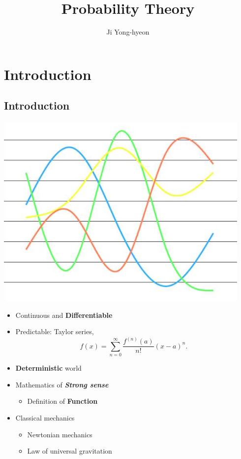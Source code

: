 \documentclass[12pt,a4paper]{article}
\author{Ji Yong-hyeon}
\title{\bf\Huge Probability Theory}
\theoremstyle{definition}
\theoremstyle{definition}
\theoremstyle{definition}
\theoremstyle{definition}
\theoremstyle{remark}
\theoremstyle{definition}
\begin{document}
\maketitle
\tableofcontents

\newpage
\section{Introduction}

\subsection{Introduction}
\begin{minipage}{0.49\textwidth}
	\begin{center}
	\includegraphics[width=.8\linewidth,height=.13\textheight]{differentiable.png}
	\end{center}
	\begin{itemize}
		\item Continuous and \textbf{Differentiable}
		\item Predictable: Taylor series, \[
		f(x)=\sum_{n=0}^\infty\frac{f^{(n)}(a)}{n!}(x-a)^n.
		\]
		\item \textbf{Deterministic} world
		\item Mathematics of \textbf{\textit{Strong sense}}\begin{itemize}
			\item Definition of \textbf{Function}
		\end{itemize}
		\item Classical mechanics\begin{itemize}
			\item Newtonian mechanics
			\item Law of universal gravitation
		\end{itemize}
	\end{itemize}
\end{minipage}%
\end{document}
